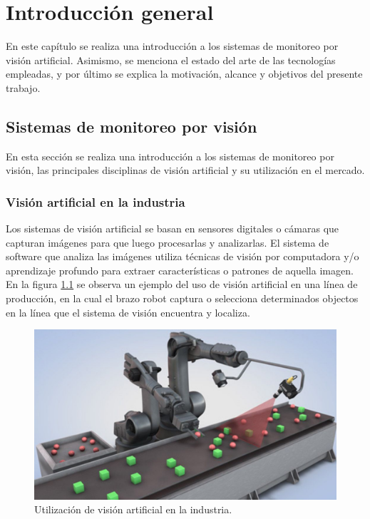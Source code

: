 
\chapter{Introducción general} %

\label{Chapter1} %
\label{IntroGeneral}

En este capítulo se realiza una introducción a los sistemas de monitoreo por visión artificial. Asimismo, se menciona el estado del arte de las tecnologías empleadas, y por último se explica la motivación, alcance y objetivos del presente trabajo.


\section{Sistemas de monitoreo por visión}
\label{sec:sistemasVision}

En esta sección se realiza una introducción a los sistemas de monitoreo por visión, las principales disciplinas de visión artificial y su utilización en el mercado.

\subsection{Visión artificial en la industria}

Los sistemas de visión artificial se basan en sensores digitales o cámaras que capturan imágenes para que luego procesarlas y analizarlas. El sistema de software que analiza las imágenes utiliza técnicas de visión por computadora y/o aprendizaje profundo para extraer características o patrones de aquella imagen. En la figura \ref{fig:visionArtificial} se observa un ejemplo del uso de visión artificial en una línea de producción, en la cual el brazo robot captura o selecciona determinados objectos en la línea que el sistema de visión encuentra y localiza.

\begin{figure}[ht]
	\centering
	\includegraphics[scale=.55]{./Figures/visionArtificial.jpg}
	\caption{Utilización de visión artificial en la industria\protect\footnotemark.}
	\label{fig:visionArtificial}
\end{figure}

